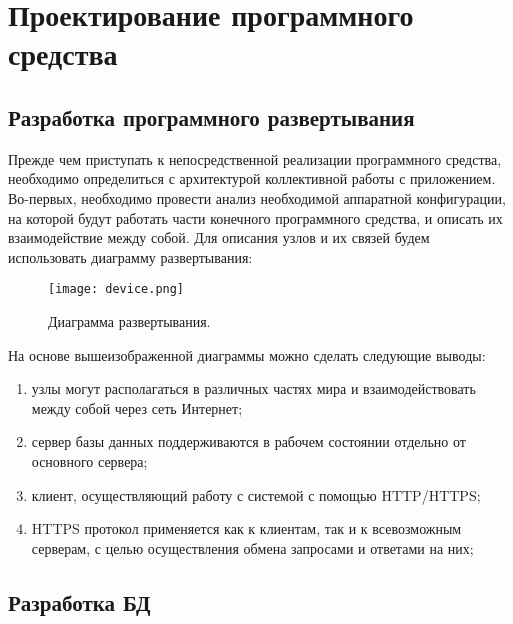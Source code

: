 \section{Проектирование программного средства} %
\label{sec:arch_and_mod}

\subsection{Разработка программного развертывания}
\label{sub:arch_and_mod:graphlib}

Прежде чем приступать к непосредственной реализации программного средства, необходимо определиться с архитектурой коллективной работы с приложением.
Во-первых, необходимо провести анализ необходимой аппаратной конфигурации, на которой будут работать части конечного программного средства, и описать их взаимодействие между собой. Для описания узлов и их связей будем использовать диаграмму развертывания:
\begin{figure}[ht]
\centering
  \texttt{[image: device.png]}  
  \caption{ Диаграмма развертывания. }
  \label{fig:domain:manual_structure:credit_device}
\end{figure}
На основе вышеизображенной диаграммы можно сделать следующие выводы:

\begin{enumerate}
  \item узлы могут располагаться в различных частях мира и взаимодействовать между собой через сеть Интернет;
  \item сервер базы данных поддерживаются в рабочем состоянии отдельно от основного сервера;
  \item клиент, осуществляющий работу с системой с помощью HTTP/HTTPS;
  \item HTTPS протокол применяется как к клиентам, так и к всевозможным серверам, с целью осуществления обмена запросами и ответами на них;
\end{enumerate}

\subsection{Разработка БД }
\label{sub:arch_and_mod:graphlib}

